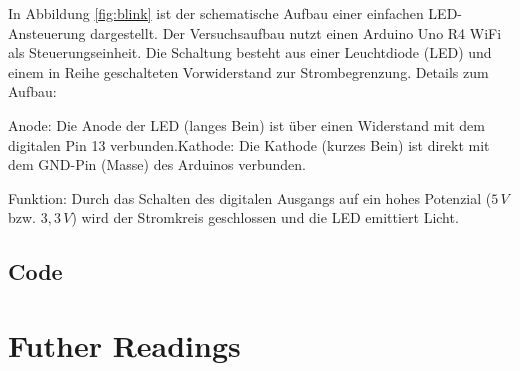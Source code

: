 In Abbildung \ref{fig:blink} ist der schematische Aufbau einer einfachen LED-Ansteuerung dargestellt. Der Versuchsaufbau nutzt einen Arduino Uno R4 WiFi als Steuerungseinheit. Die Schaltung besteht aus einer Leuchtdiode (LED) und einem in Reihe geschalteten Vorwiderstand zur Strombegrenzung.
Details zum Aufbau:
\begin{itemize}{
\item Anode: Die Anode der LED (langes Bein) ist über einen Widerstand mit dem digitalen Pin 13 verbunden.Kathode: Die Kathode (kurzes Bein) ist direkt mit dem GND-Pin (Masse) des Arduinos verbunden.
\item Funktion: Durch das Schalten des digitalen Ausgangs auf ein hohes Potenzial ($5\,V$ bzw. $3,3\,V$) wird der Stromkreis geschlossen und die LED emittiert Licht.
} \end{itemize}

\subsection{Code}
\begin{center}
	\label{code:Blink}
\end{center}

\section{Futher Readings}

